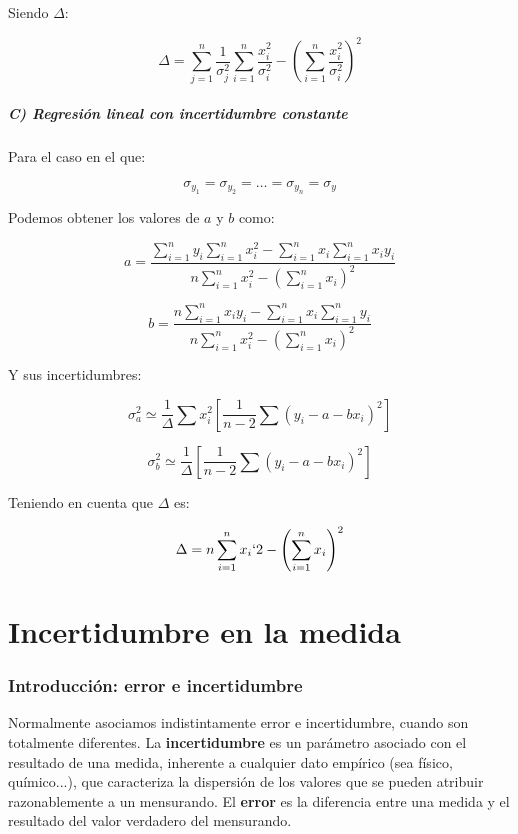 \documentclass[12pt,a4paper]{book}
\newcommand{\parentesis}[1]{\left( #1 \right)}
\newcommand{\suma}[1]{\sum_{i=1}^n  #1}
\begin{document}
Siendo $\Delta$:

\begin{equation}
\Delta = \sum_{j=1}^n \dfrac{1}{\sigma_j^2 } \sum_{i=1}^n \dfrac{x_i^2}{\sigma_i^2} - \parentesis{ \sum_{i=1}^n \dfrac{x_i^2}{\sigma_i^2} }^2
\end{equation} 


\paragraph{C) Regresión lineal con incertidumbre constante}

Para el caso en el que:


$$ \sigma_{y_1} = \sigma_{y_2} = \ldots = \sigma_{y_n} = \sigma_y  $$

Podemos obtener los valores de $a$ y $b$ como:

\begin{equation}
a =  \dfrac{\suma{y_i} \suma{x_i^2} - \suma{x_i} \suma{x_i y_i}}{n \suma{x_i^2} - \parentesis{\suma{x_i}}^2}
\end{equation}

\begin{equation}
b  =  \dfrac{ n\suma{x_i y_i}  - \suma{x_i} \suma{y_i}}{n \suma{x_i^2} - \parentesis{\suma{x_i}}^2}
\end{equation}

Y sus incertidumbres:

\begin{equation}
\sigma_a^2 \simeq \dfrac{1}{\Delta} \sum{x_i^2 \left[ \dfrac{1}{n-2}\sum{(y_i -a -bx_i)^2} \right]}
\end{equation}

\begin{equation}
\sigma_b^2 \simeq \dfrac{1}{\Delta} \left[ \dfrac{1}{n-2} \sum{(y_i-a-bx_i)^2} \right]
\end{equation}

Teniendo en cuenta que $\Delta$ es:

\begin{equation}
\Delta = n \suma{x_i`2} - \parentesis{\suma{x_i}}^2
\end{equation}

\newpage

\chapter{Incertidumbre en la medida}

\subsection{Introducción: error e incertidumbre}
Normalmente asociamos indistintamente error e incertidumbre, cuando son totalmente diferentes. La \textbf{incertidumbre} es un parámetro asociado con el resultado de una medida, inherente a cualquier dato empírico (sea físico, químico...), que caracteriza la dispersión de los valores que se pueden atribuir razonablemente a un mensurando. El \textbf{error} es la diferencia entre una medida y el resultado del valor verdadero del mensurando. \\
\end{document}
